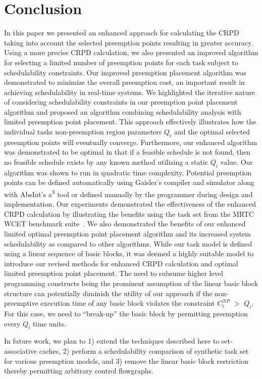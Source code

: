 \section{Conclusion}\label{sec:conclusion}

In this paper we presented an enhanced approach for calculating the
CRPD taking into account the selected preemption points resulting
in greater accuracy.  Using a more precise CRPD calculation, we also
presented an improved algorithm for selecting a limited number of
preemption points for each task subject to schedulability constraints.
Our improved preemption placement algorithm was demonstrated to
minimize the overall preemption cost, an important result in achieving
schedulability in real-time systems.  We highlighted the iterative nature
of considering schedulability constraints in our preemption point
placement algorithm and proposed an algorithm combining schedulability
analysis with limited preemption point placement.  This approach
effectively illustrates how the individual tasks non-preemption
region parameters $Q_i$ and the optimal selected preemption points will
eventually converge.  Furthermore, our enhanced algorithm was demonstrated to be
optimal in that if a feasible schedule is not found, then no feasible
schedule exists by any known method utilizing a static $Q_i$ value.  Our algorithm
was shown to run in quadratic time complexity.  Potential preemption points can be
defined automatically using Gaisler's compiler and simulator along with AbsInt's
a\textsuperscript{3} tool or defined manually by the programmer during design
and implementation. Our experiments demonstrated the effectiveness of
the enhanced CRPD calculation by illustrating the benefits using the
task set from the MRTC WCET benchmark suite~\cite{mrtc:01}.
We also demonstrated the benefits of our enhanced limited optimal preemption
point placement algorithm and its increased system schedulability as
compared to other algorithms.  While our task model is defined using a linear
sequence of basic blocks, it was deemed a highly suitable model to introduce
our revised methods for enhanced CRPD calculation and optimal limited
preemption point placement.  The need to subsume higher level programming constructs
being the prominent assumption of the linear basic block structure can potentially
diminish the utility of our approach if the non-preemptive execution time of any basic block
violates the constraint \begin{math}C_{i}^{NP}\end{math} \begin{math}>\end{math} \begin{math}Q_{i}\end{math}.  For this case, we need to ``break-up'' the basic block by permitting preemption every $Q_i$ time units.

In future work, we plan to 1) extend the techniques described here to set-associative caches,
2) perform a schedulability comparison of synthetic task set for various preemption models, and
3) remove the linear basic block restriction thereby permitting arbitrary control flowgraphs.
